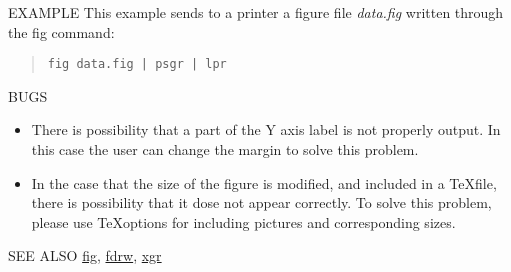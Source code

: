 \begin{options}
\end{options}

\begin{qsection}{EXAMPLE}
This example sends to a printer a figure file {\em data.fig}
written through the fig command:
\begin{quote}
 \verb!fig data.fig | psgr | lpr!
\end{quote}
\end{qsection}

\begin{qsection}{BUGS}
\begin{itemize}
\item There is possibility that a part of the Y axis label
is not properly output. In this case the user can 
change the margin to solve this problem.

\item In the case that the size of the figure is modified,
and included in a \TeX file, there is possibility that
it dose not appear correctly.
To solve this problem, please use \TeX options for including 
pictures and corresponding sizes.
\end{itemize}
\end{qsection}

\begin{qsection}{SEE ALSO}
\hyperlink{fig}{fig},
\hyperlink{fdrw}{fdrw},
\hyperlink{xgr}{xgr}
\end{qsection}
